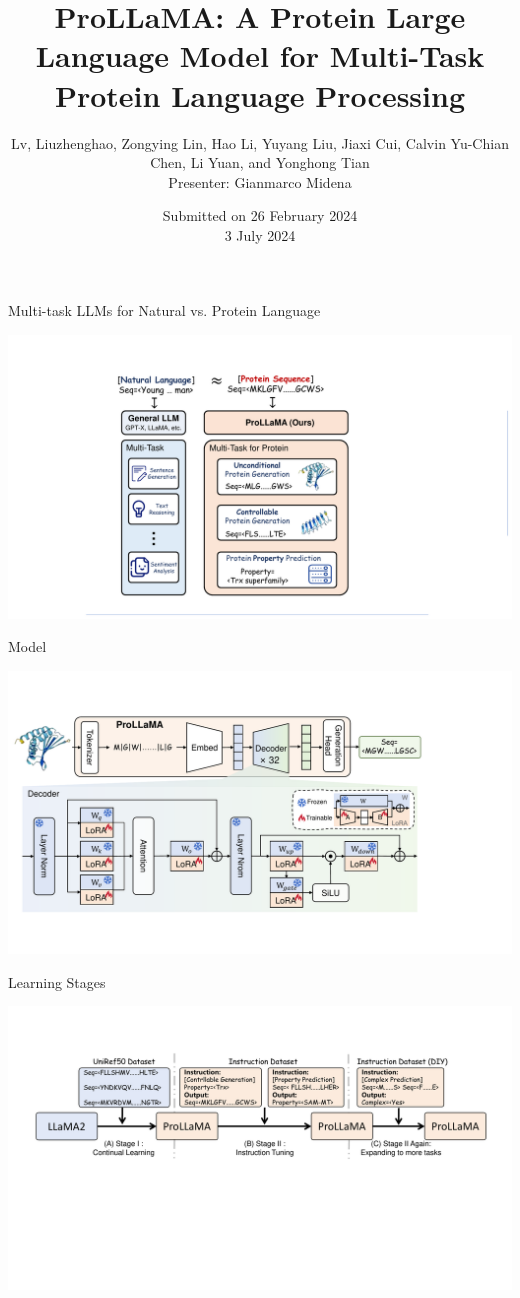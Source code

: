 \documentclass[dvipsnames]{beamer}
\title[ProLLaMA]
{ProLLaMA: A Protein Large Language Model for Multi-Task Protein Language Processing}
\author[Liuzhenghao Lv et al.]{Lv, Liuzhenghao, Zongying Lin, Hao Li, Yuyang Liu, Jiaxi Cui, Calvin Yu-Chian Chen, Li Yuan, and Yonghong Tian
\\\vspace{2em}Presenter: Gianmarco Midena}
\date[3 July 2024]{Submitted on 26 February 2024 
\\\vspace{2em}3 July 2024}
\begin{document}
\begin{frame}
\titlepage
\end{frame}

\begin{frame}{Multi-task LLMs for Natural vs. Protein Language}
	\begin{center}
		\includegraphics[scale=0.5]{images/multitask_LLMs_NLP_vs_PLP.pdf}
	\end{center}
\end{frame}

\begin{frame}{Model}
	\begin{center}
		\includegraphics[scale=0.44]{images/model.pdf}
	\end{center}
\end{frame}

\begin{frame}{Learning Stages}
	\begin{center}
		\includegraphics[scale=0.39]{images/training.pdf}
	\end{center}
\end{frame}
\end{document}
